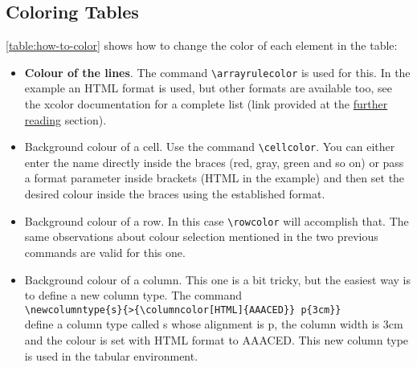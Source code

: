 \newpage
\subsection{Coloring Tables}

\noindent \autoref{table:how-to-color} shows how to change the color of each element in the table:

\begin{itemize}
  \item \textbf{Colour of the lines}. The command \verb|\arrayrulecolor| is used for this. In the example an HTML format is used, but other formats are available too, see the xcolor documentation for a complete list (link provided at the \href{https://www.overleaf.com/learn/latex/Tables#Further_reading}{further reading} section).
  \item Background colour of a cell. Use the command \verb|\cellcolor|. You can either enter the name directly inside the braces (red, gray, green and so on) or pass a format parameter inside brackets (HTML in the example) and then set the desired colour inside the braces using the established format.
  \item Background colour of a row. In this case \verb|\rowcolor| will accomplish that. The same observations about colour selection mentioned in the two previous commands are valid for this one.
  \item Background colour of a column. This one is a bit tricky, but the easiest way is to define a new column type. The command \\\verb|\newcolumntype{s}{>{\columncolor[HTML]{AAACED}} p{3cm}}| \\ define a column type called s whose alignment is p, the column width is 3cm and the colour is set with HTML format to AAACED. This new column type is used in the tabular environment.
\end{itemize}

    \setlength{\arrayrulewidth}{1mm}
    \setlength{\tabcolsep}{18pt}
    \renewcommand{\arraystretch}{2.5}

